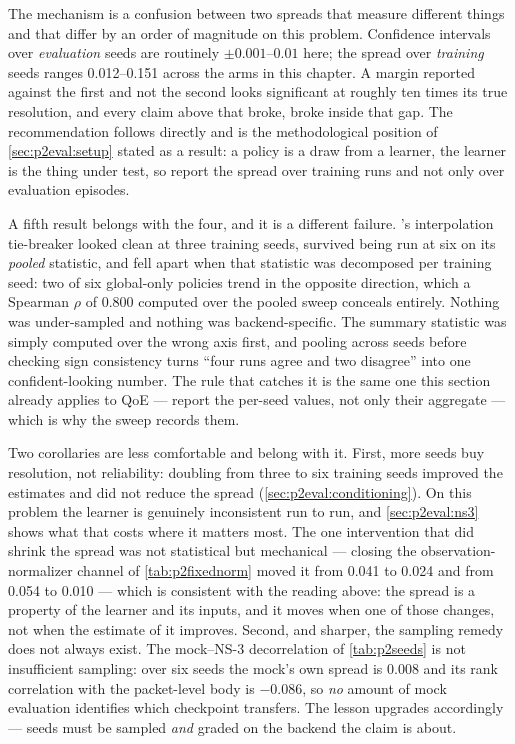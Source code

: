 The mechanism is a confusion between two spreads that measure different things and that differ by an
order of magnitude on this problem. Confidence intervals over \emph{evaluation} seeds are routinely
$\pm 0.001$--$0.01$ here; the spread over \emph{training} seeds ranges 0.012--0.151 across the arms in
this chapter. A margin reported against the first and not the second looks significant at roughly ten
times its true resolution, and every claim above that broke, broke inside that gap. The recommendation
follows directly and is the methodological position of \cref{sec:p2eval:setup} stated as a result: a
policy is a draw from a learner, the learner is the thing under test, so report the spread over training
runs and not only over evaluation episodes.

A fifth result belongs with the four, and it is a different failure. 's
interpolation tie-breaker looked clean at three training seeds, survived being run at six on its
\emph{pooled} statistic, and fell apart when that statistic was decomposed per training seed: two of six
global-only policies trend in the opposite direction, which a Spearman $\rho$ of 0.800 computed over the
pooled sweep conceals entirely. Nothing was under-sampled and nothing was backend-specific. The summary
statistic was simply computed over the wrong axis first, and pooling across seeds before checking sign
consistency turns ``four runs agree and two disagree'' into one confident-looking number. The rule that
catches it is the same one this section already applies to QoE --- report the per-seed values, not only
their aggregate --- which is why the sweep records them.

Two corollaries are less comfortable and belong with it. First, more seeds buy resolution, not
reliability: doubling from three to six training seeds improved the estimates and did not reduce the
spread (\cref{sec:p2eval:conditioning}). On this problem the learner is genuinely inconsistent run to
run, and \cref{sec:p2eval:ns3} shows what that costs where it matters most. The one intervention that
did shrink the spread was not statistical but mechanical --- closing the observation-normalizer channel
of \cref{tab:p2fixednorm} moved it from 0.041 to 0.024 and from 0.054 to 0.010 --- which is consistent
with the reading above: the spread is a property of the learner and its inputs, and it moves when one of
those changes, not when the estimate of it improves. Second, and sharper, the
sampling remedy does not always exist. The mock--NS-3 decorrelation of \cref{tab:p2seeds} is not
insufficient sampling: over six seeds the mock's own spread is 0.008 and its rank correlation with the
packet-level body is $-0.086$, so \emph{no} amount of mock evaluation identifies which checkpoint
transfers. The lesson upgrades accordingly --- seeds must be sampled \emph{and} graded on the backend
the claim is about.


